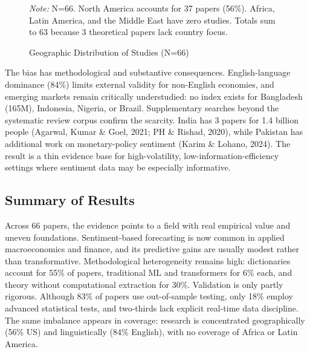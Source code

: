 \documentclass[12pt,oneside]{article}
\begin{document}
\begin{figure}[htbp]
\centering
\caption{Geographic Distribution of Studies (N=66)}
\label{fig:geographic}
\noindent\begin{minipage}{0.94\textwidth}
\raggedright\footnotesize
\textit{Note:} N=66. North America accounts for 37 papers (56\%). Africa, Latin America, and the Middle East have zero studies. Totals sum to 63 because 3 theoretical papers lack country focus.
\end{minipage}
\end{figure}

The bias has methodological and substantive consequences. English-language dominance (84\%) limits external validity for non-English economies, and emerging markets remain critically understudied: no index exists for Bangladesh (165M), Indonesia, Nigeria, or Brazil. Supplementary searches beyond the systematic review corpus confirm the scarcity. India has 3 papers for 1.4 billion people (Agarwal, Kumar \& Goel, 2021; PH \& Rishad, 2020), while Pakistan has additional work on monetary-policy sentiment (Karim \& Lohano, 2024). The result is a thin evidence base for high-volatility, low-information-efficiency settings where sentiment data may be especially informative.

\subsection{Summary of Results}

Across 66 papers, the evidence points to a field with real empirical value and uneven foundations. Sentiment-based forecasting is now common in applied macroeconomics and finance, and its predictive gains are usually modest rather than transformative. Methodological heterogeneity remains high: dictionaries account for 55\% of papers, traditional ML and transformers for 6\% each, and theory without computational extraction for 30\%. Validation is only partly rigorous. Although 83\% of papers use out-of-sample testing, only 18\% employ advanced statistical tests, and two-thirds lack explicit real-time data discipline. The same imbalance appears in coverage: research is concentrated geographically (56\% US) and linguistically (84\% English), with no coverage of Africa or Latin America.
\end{document}
